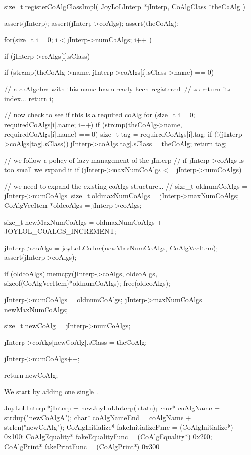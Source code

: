 \startCCode
size_t registerCoAlgClassImpl(
  JoyLoLInterp *jInterp,
  CoAlgClass *theCoAlg
) {
  assert(jInterp);
  assert(jInterp->coAlgs);
  assert(theCoAlg);
  
  for(size_t i = 0; i < jInterp->numCoAlgs; i++ ) {
    if (jInterp->coAlgs[i].sClass) {
      if (strcmp(theCoAlg->name,
        jInterp->coAlgs[i].sClass->name) == 0) {
    
        // a coAlgebra with this name has already been registered. 
        // so return its index...
        return i;
      }
    }
  }

  // now check to see if this is a required coAlg
  for (size_t i = 0; requiredCoAlgs[i].name; i++) {
    if (strcmp(theCoAlg->name, requiredCoAlgs[i].name) == 0) {
      size_t tag = requiredCoAlgs[i].tag;
      if (!(jInterp->coAlgs[tag].sClass)) {
        jInterp->coAlgs[tag].sClass = theCoAlg;
      }
      return tag;
    }
  }

  // we follow a policy of lazy management of the jInterp
  // if jInterp->coAlgs is too small we expand it
  if (jInterp->maxNumCoAlgs <= jInterp->numCoAlgs) {
    // we need to expand the existing coAlgs structure...
    //  
    size_t oldnumCoAlgs     = jInterp->numCoAlgs;
    size_t oldmaxNumCoAlgs  = jInterp->maxNumCoAlgs;
    CoAlgVecItem *oldcoAlgs = jInterp->coAlgs;
    
    size_t newMaxNumCoAlgs =
      oldmaxNumCoAlgs + JOYLOL_COALGS_INCREMENT;

    jInterp->coAlgs =
      joyLoLCalloc(newMaxNumCoAlgs, CoAlgVecItem);
    assert(jInterp->coAlgs);
    
    if (oldcoAlgs) {
      memcpy(jInterp->coAlgs,
        oldcoAlgs,
        sizeof(CoAlgVecItem)*oldnumCoAlgs);
      free(oldcoAlgs);
    }
    
    jInterp->numCoAlgs    = oldnumCoAlgs;
    jInterp->maxNumCoAlgs = newMaxNumCoAlgs;
  }
  
  size_t newCoAlg = jInterp->numCoAlgs;
  
  jInterp->coAlgs[newCoAlg].sClass      = theCoAlg;
  
  jInterp->numCoAlgs++;
  
  return newCoAlg;
}
\stopCCode


We start by adding one single . 

\startCTest
  JoyLoLInterp *jInterp = newJoyLoLInterp(lstate);
  char*            coAlgName          = strdup("newCoAlgA");
  char*            coAlgNameEnd       = coAlgName + strlen("newCoAlg");
  CoAlgInitialize* fakeInitializeFunc = (CoAlgInitialize*) 0x100;
  CoAlgEquality*   fakeEqualityFunc   = (CoAlgEquality*)   0x200;
  CoAlgPrint*      fakePrintFunc      = (CoAlgPrint*)      0x300;
  
